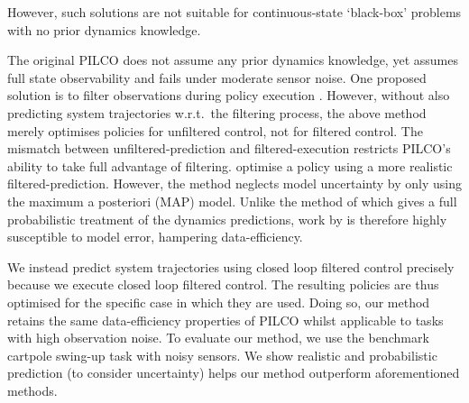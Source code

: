 \documentclass{article}
\newcommand{\note}[1]{}        %
\begin{document}
However, such solutions are not suitable for continuous-state `black-box' problems with no prior dynamics knowledge.
\note{PILCO fails...}
The original PILCO does not assume any prior dynamics knowledge,
yet assumes full state observability and fails under moderate sensor noise.
One proposed solution is to filter observations during policy execution \cite{deisenroth2013}.
However, without also predicting system trajectories w.r.t.\ the filtering process, %
the above method merely optimises policies for unfiltered control, not for filtered control.
The mismatch between unfiltered-prediction and filtered-execution
restricts PILCO's ability to take full advantage of filtering. %
%
\citet{dallaire2009} optimise a policy using a more realistic filtered-prediction.
However, the method neglects model uncertainty by only
using the maximum a posteriori (MAP) model.
Unlike the method of \citet{deisenroth2013} which gives a full probabilistic treatment of the dynamics predictions,
work by \citet{dallaire2009}
is therefore highly susceptible to model error,
hampering data-efficiency.

We instead predict system trajectories using closed loop filtered control precisely because
we execute closed loop filtered control.
The resulting policies are thus optimised for the specific case in which they are used.
Doing so,
our method retains the same data-efficiency properties of PILCO
whilst applicable to tasks with high observation noise.
%
To evaluate our method, we use the benchmark cartpole swing-up task with noisy sensors.
We show realistic and probabilistic prediction (to consider uncertainty)
helps our method outperform aforementioned methods.
%
\end{document}
